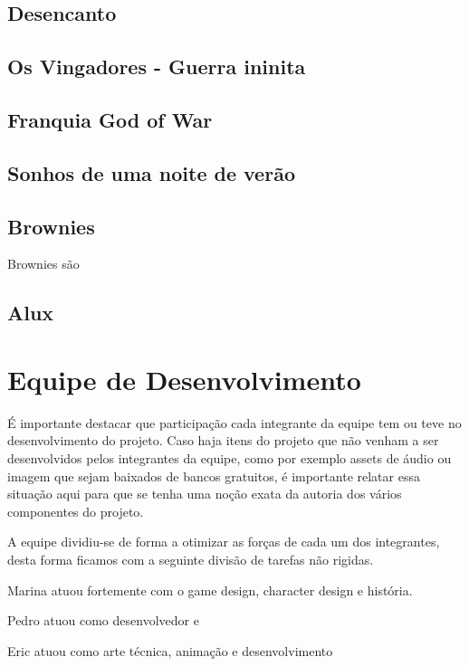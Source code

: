 \subsection{Desencanto}
\subsection{Os Vingadores - Guerra ininita}
\subsection{Franquia God of War}
\subsection{Sonhos de uma noite de verão}
\subsection{Brownies}
Brownies são 
\subsection{Alux}

\section{Equipe de Desenvolvimento}
É importante destacar que participação cada integrante da equipe tem ou teve no desenvolvimento do projeto.
Caso haja itens do projeto que não venham a ser desenvolvidos pelos integrantes da equipe, como por exemplo assets de áudio ou imagem que sejam baixados de bancos gratuitos, é importante relatar essa situação aqui para que se tenha uma noção exata da autoria dos vários componentes do projeto.

A equipe dividiu-se de forma a otimizar as forças de cada um dos integrantes, desta forma ficamos com a seguinte divisão de tarefas não rigidas. 

Marina atuou fortemente com o game design, character design e história. 

Pedro atuou como desenvolvedor e 

Eric atuou como arte técnica, animação e desenvolvimento